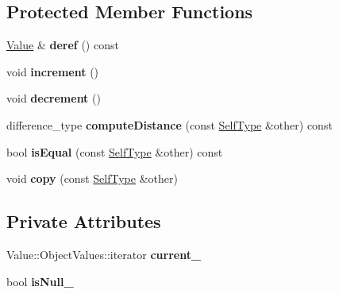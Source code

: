 \subsection*{Protected Member Functions}
\begin{DoxyCompactItemize}
\item 
\hypertarget{class_json_1_1_value_iterator_base_a40a20c65abc423a26e3aae68d9a0525c}{}\hyperlink{class_json_1_1_value}{Value} \& {\bfseries deref} () const \label{class_json_1_1_value_iterator_base_a40a20c65abc423a26e3aae68d9a0525c}

\item 
\hypertarget{class_json_1_1_value_iterator_base_afe58f9534e1fd2033419fd9fe244551e}{}void {\bfseries increment} ()\label{class_json_1_1_value_iterator_base_afe58f9534e1fd2033419fd9fe244551e}

\item 
\hypertarget{class_json_1_1_value_iterator_base_affc8cf5ff54a9f432cc693362c153fa6}{}void {\bfseries decrement} ()\label{class_json_1_1_value_iterator_base_affc8cf5ff54a9f432cc693362c153fa6}

\item 
\hypertarget{class_json_1_1_value_iterator_base_ad6c553b249e89e3dc9933e100ccbe064}{}difference\+\_\+type {\bfseries compute\+Distance} (const \hyperlink{class_json_1_1_value_iterator_base}{Self\+Type} \&other) const \label{class_json_1_1_value_iterator_base_ad6c553b249e89e3dc9933e100ccbe064}

\item 
\hypertarget{class_json_1_1_value_iterator_base_a21820d6ee564e541bd118b21e4741962}{}bool {\bfseries is\+Equal} (const \hyperlink{class_json_1_1_value_iterator_base}{Self\+Type} \&other) const \label{class_json_1_1_value_iterator_base_a21820d6ee564e541bd118b21e4741962}

\item 
\hypertarget{class_json_1_1_value_iterator_base_a496e6aba44808433ec5858c178be5719}{}void {\bfseries copy} (const \hyperlink{class_json_1_1_value_iterator_base}{Self\+Type} \&other)\label{class_json_1_1_value_iterator_base_a496e6aba44808433ec5858c178be5719}

\end{DoxyCompactItemize}
\subsection*{Private Attributes}
\begin{DoxyCompactItemize}
\item 
\hypertarget{class_json_1_1_value_iterator_base_ab3138ce8af8301cca3b041ea55cb922a}{}Value\+::\+Object\+Values\+::iterator {\bfseries current\+\_\+}\label{class_json_1_1_value_iterator_base_ab3138ce8af8301cca3b041ea55cb922a}

\item 
\hypertarget{class_json_1_1_value_iterator_base_a3e08b114a1aed9bde518c527f94a8c59}{}bool {\bfseries is\+Null\+\_\+}\label{class_json_1_1_value_iterator_base_a3e08b114a1aed9bde518c527f94a8c59}

\end{DoxyCompactItemize}


